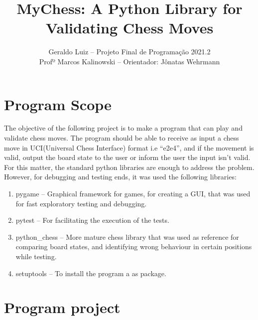 \documentclass[10pt]{article}
\author{Geraldo Luiz -- Projeto Final de Programação 2021.2\\ Profº Marcos
Kalinowski -- Orientador: Jônatas Wehrmann}
\title{MyChess: A Python Library for Validating Chess Moves}
\date{}
\begin{document}
\maketitle

\section{Program Scope}

The objective of the following project is to make a program that can play and
validate chess moves. The program should be able to receive as input a chess move in UCI(Universal Chess Interface) format i.e
``e2e4'', and if the movement is valid, output the board state to the user or inform
the user the input isn't valid. For this matter, the standard python libraries
are enough to address the problem. However, for debugging and testing ends, it was
used the following libraries:

\begin{enumerate}[label=\alph*)]
\item pygame -- Graphical framework for games, for creating a GUI, that was used
    for fast exploratory testing and debugging.
\item pytest -- For facilitating the execution of the tests.
\item python\_chess -- More mature chess library that was used as reference for comparing board states, and identifying wrong behaviour in certain positions while testing.
\item setuptools -- To install the program a as package.
\end{enumerate}



\section{Program project}
\end{document}
